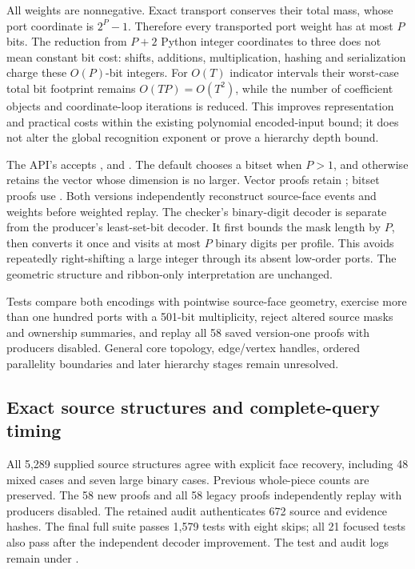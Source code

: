 All weights are nonnegative. Exact transport conserves their total mass,
whose port coordinate is $2^P-1$. Therefore every transported port weight
has at most $P$ bits. The reduction from $P+2$ Python integer coordinates
to three does not mean constant bit cost: shifts, additions, multiplication,
hashing and serialization charge these $O(P)$-bit integers. For $O(T)$
indicator intervals their worst-case total bit footprint remains
$O(TP)=O(T^2)$, while the number of coefficient objects and coordinate-loop
iterations is reduced. This improves representation and practical costs
within the existing polynomial encoded-input bound; it does not alter
the global recognition exponent or prove a hierarchy depth bound.

The API's  accepts ,  and
. The default chooses a bitset when $P>1$, and otherwise retains
the vector whose dimension is no larger. Vector proofs retain
; bitset proofs use
. Both versions independently reconstruct
source-face events and weights before weighted replay. The checker's
binary-digit decoder is separate from the producer's least-set-bit decoder.
It first bounds the mask length by $P$, then converts it once and visits
at most $P$ binary digits per profile. This avoids repeatedly right-shifting
a large integer through its absent low-order ports.
The geometric structure and ribbon-only interpretation are unchanged.

Tests compare both encodings with pointwise source-face geometry, exercise
more than one hundred ports with a 501-bit multiplicity, reject altered
source masks and ownership summaries, and replay all 58 saved version-one
proofs with producers disabled. General core topology, edge/vertex handles,
ordered parallelity boundaries and later hierarchy stages remain unresolved.

\subsection{Exact source structures and complete-query timing}

All 5,289 supplied source structures agree with explicit face recovery,
including 48 mixed cases and seven large binary cases. Previous whole-piece
counts are preserved. The 58 new proofs and all 58 legacy proofs independently
replay with producers disabled. The retained audit authenticates 672 source
and evidence hashes. The final full suite passes 1,579 tests with eight skips;
all 21 focused tests also pass after the independent decoder improvement.
The test and audit logs remain under .

